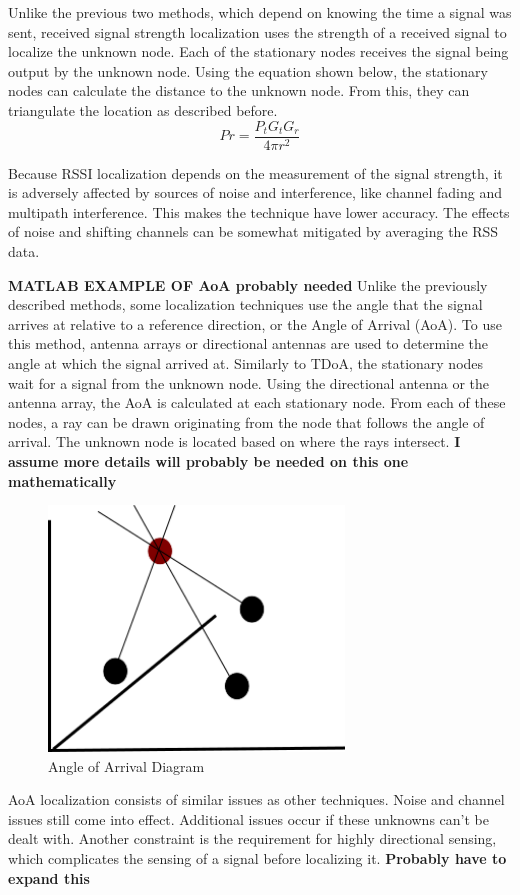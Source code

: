 Unlike the previous two methods, which depend on knowing the time a signal was sent, received signal strength localization uses the strength of a received signal to localize the unknown node\cite{local_conf}. Each of the stationary nodes receives the signal being output by the unknown node. Using the equation shown below\cite{rss_calc}, the stationary nodes can calculate the distance to the unknown node. From this, they can triangulate the location as described before.
\[Pr = \frac{P_t G_t G_r}{4πr^2} \]\par
Because RSSI localization depends on the measurement of the signal strength, it is adversely affected by sources of noise and interference, like channel fading and multipath interference\cite{local_conf}. This makes the technique have lower accuracy. The effects of noise and shifting channels can be somewhat mitigated by averaging the RSS data.

\textbf{MATLAB EXAMPLE OF AoA probably needed}
Unlike the previously described methods, some localization techniques use the angle that the signal arrives at relative to a reference direction, or the Angle of Arrival (AoA)\cite{local_aoa}. To use this method, antenna arrays or directional antennas are used to determine the angle at which the signal arrived at. Similarly to TDoA, the stationary nodes wait for a signal from the unknown node. Using the directional antenna or the antenna array, the AoA is calculated at each stationary node. From each of these nodes, a ray can be drawn originating from the node that follows the angle of arrival. The unknown node is located based on where the rays intersect.
\textbf{I assume more details will probably be needed on this one mathematically}
\begin{figure}[ht]
\centering
\includegraphics[width=0.70\textwidth]{img/path4188.png}
\caption{Angle of Arrival Diagram}
\label{fig:aoa_diagram}
\end{figure}\par
AoA localization consists of similar issues as other techniques. Noise and channel issues still come into effect. Additional issues occur if these unknowns can’t be dealt with. Another constraint is the requirement for highly directional sensing, which complicates the sensing of a signal before localizing it. \textbf{Probably have to expand this}

